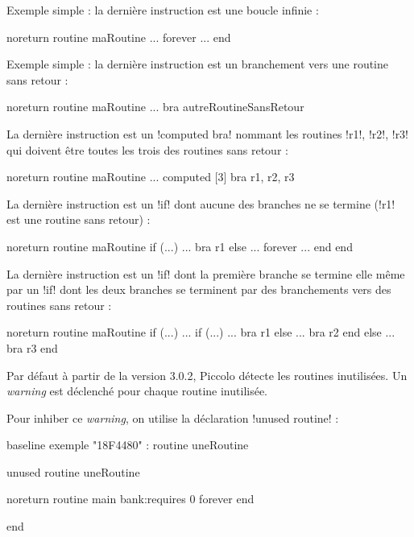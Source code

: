 Exemple simple : la dernière instruction est une boucle infinie :
\begin{piccolo}
noreturn routine maRoutine {
  ...
  forever
    ...
  end
}
\end{piccolo}

Exemple simple : la dernière instruction est un branchement vers une routine sans retour :
\begin{piccolo}
noreturn routine maRoutine {
  ...
  bra autreRoutineSansRetour
}
\end{piccolo}

La dernière instruction est un \pic!computed bra! nommant les routines \pic!r1!, \pic!r2!, \pic!r3! qui doivent être toutes les trois des routines sans retour :
\begin{piccolo}
noreturn routine maRoutine {
  ...
  computed [3] bra r1, r2, r3
}
\end{piccolo}

La dernière instruction est un \pic!if! dont aucune des branches ne se termine (\pic!r1! est une routine sans retour) :
\begin{piccolo}
noreturn routine maRoutine {
  if (...)
    ...
    bra r1
  else
    ...
    forever
      ...
    end
  end
}

\end{piccolo}


La dernière instruction est un \pic!if! dont la première branche se termine elle même par un \pic!if! dont les deux branches se terminent par des branchements vers des routines sans retour :
\begin{piccolo}
noreturn routine maRoutine {
  if (...)
    ...
    if (...)
      ...
      bra r1
    else
      ...
      bra r2
    end
  else
    ...
    bra r3
  end
}
\end{piccolo}







Par défaut à partir de la version 3.0.2, Piccolo détecte les routines inutilisées. Un \emph{warning} est déclenché pour chaque routine inutilisée.

Pour inhiber ce \emph{warning}, on utilise la déclaration \pic!unused routine! :

\begin{piccolo}
baseline exemple "18F4480" :
routine uneRoutine {
}

unused routine uneRoutine
 
noreturn routine main bank:requires 0 {
  forever
  end
}

end
\end{piccolo}

